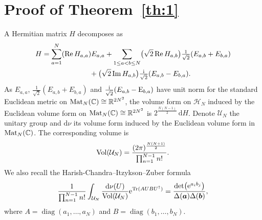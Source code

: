 \documentclass[pdftex]{sigma}
\numberwithin{equation}{section}
\newcommand{\dd}{\mathrm{d}}
\begin{document}
\section{Proof of Theorem~\ref{th:1}}
\label{S2}
A Hermitian matrix $H$ decomposes as
\begin{gather*}
H = \sum_{a = 1}^N (\operatorname{Re} H_{a,a}) E_{a,a}+ \sum_{1 \leq a < b \leq N} \bigl(\sqrt{2} \operatorname{Re} H_{a,b}\bigr) \tfrac{1}{\sqrt{2}}(E_{a,b} + E_{b,a}) \\
\hphantom{H =}{}
 + \bigl(\sqrt{2} \operatorname{Im} H_{a,b}\bigr) \tfrac{{\rm i}}{\sqrt{2}}(E_{a,b} - E_{b,a}).
\end{gather*}
As $E_{a,a}$, $\frac{1}{\sqrt{2}}(E_{a,b} + E_{b,a})$ and $\frac{{\rm i}}{\sqrt{2}}(E_{a,b} - {\rm E}_{b,a})$ have unit norm for the standard Euclidean metric on ${\rm Mat}_{N}(\mathbb{C}) \cong \mathbb{R}^{2N^2}$, the volume form on $\mathcal{H}_N$ induced by the Euclidean volume form on ${\rm Mat}_N(\mathbb{C}) \cong \mathbb{R}^{2N^2}$ is $2^{\frac{N(N - 1)}{2}}\,\dd H$. Denote $\mathcal{U}_N$ the unitary group and $\dd\nu$ its volume form induced by the Euclidean volume form in ${\rm Mat}_N(\mathbb{C})$. The corresponding volume is
 \[
 {\rm Vol}(\mathcal{U}_N) = \frac{(2\pi)^{\frac{N(N + 1)}{2}}}{\prod_{n = 1}^{N - 1} n!}.
\]
We also recall the Harish-Chandra--Itzykson--Zuber formula \cite{Itzykson:1979fi}
\[
\frac{1}{\prod_{n = 1}^{N - 1} n!} \int_{\mathcal{U}_N} \frac{\dd \nu(U)}{{\rm Vol}(\mathcal{U}_N)} {\rm e}^{{\rm Tr}(AUBU^{\dagger})} = \frac{\det\bigl({\rm e}^{a_ib_j}\bigr)}{\Delta(\boldsymbol{a})\Delta(\boldsymbol{b})},
\]
 where $A = \operatorname{diag}(a_1,\dots,a_N)$ and $B = \operatorname{diag}(b_1,\dots,b_N)$.
\end{document}
